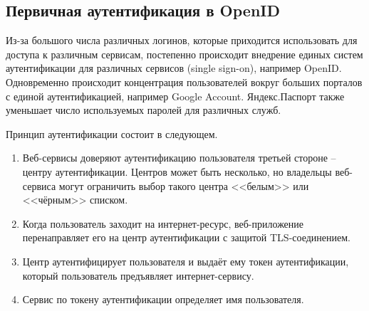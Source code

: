 \subsection{Первичная аутентификация в OpenID}

Из-за большого числа различных логинов, которые приходится использовать для доступа к различным сервисам, постепенно происходит внедрение единых систем аутентификации для различных сервисов (single sign-on), например OpenID. Одновременно происходит концентрация пользователей вокруг больших порталов с единой аутентификацией, например Google Account. Яндекс.Паспорт также уменьшает число используемых паролей для различных служб.

Принцип аутентификации состоит в следующем.
\begin{enumerate}
    \item Веб-сервисы доверяют аутентификацию пользователя третьей стороне -- центру аутентификации. Центров может быть несколько, но владельцы веб-сервиса могут ограничить выбор такого центра <<белым>> или <<чёрным>> списком.
    \item Когда пользователь заходит на интернет-ресурс, веб-при\-ло\-же\-ние перенаправляет его на центр аутентификации с защитой TLS-соединением.
    \item Центр аутентифицирует пользователя и выдаёт ему токен аутентификации, который пользователь предъявляет ин\-тер\-нет-сер\-ви\-су.
    \item Сервис по токену аутентификации определяет имя пользователя.
\end{enumerate}

